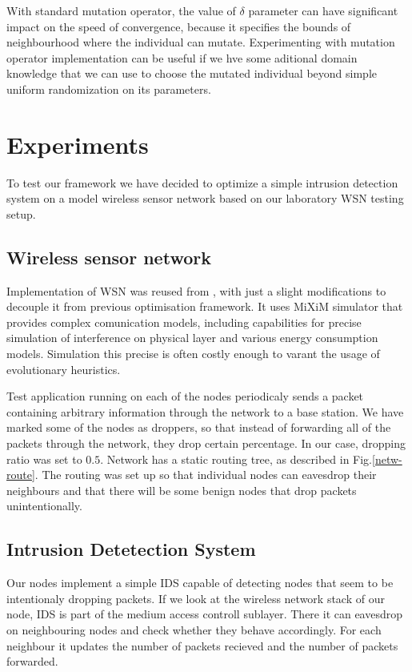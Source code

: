 \documentclass[12pt,oneside]{fithesis2}
\begin{document}
With standard mutation operator, the value of $\delta$ parameter can have significant impact on the speed of convergence, because it specifies the bounds of neighbourhood where the individual can mutate. Experimenting with mutation operator implementation can be useful if we hve some aditional domain knowledge that we can use to choose the mutated individual beyond simple uniform randomization on its parameters.


\chapter{Experiments}
\label{chap:exp}
To test our framework we have decided to optimize a simple intrusion detection system on a model wireless sensor network based on our laboratory WSN testing setup.

\section{Wireless sensor network}
Implementation of WSN was reused from \cite{stehl2013opt}, with just a slight modifications to decouple it from previous optimisation framework. It uses MiXiM simulator that provides complex comunication models, including capabilities for precise simulation of interference on physical layer and various energy consumption models. Simulation this precise is often costly enough to varant the usage of evolutionary heuristics.

Test application running on each of the nodes periodicaly sends a packet containing arbitrary information through the network to a base station. 
We have marked some of the nodes as droppers, so that instead of forwarding all of the packets through the network, they drop certain percentage. In our case, dropping ratio was set to $0.5$. Network has a static routing tree, as described in Fig.\ref{netw-route}. The routing was set up so that individual nodes can eavesdrop their neighbours and that there will be some benign nodes that drop packets unintentionally.

\section{Intrusion Detetection System}
Our nodes implement a simple IDS capable of detecting nodes that seem to be intentionaly dropping packets.
If we look at the wireless network stack of our node, IDS is part of the medium access controll sublayer.
There it can eavesdrop on neighbouring nodes and check whether they behave accordingly.
For each neighbour it updates the number of packets recieved and the number of packets forwarded.
\end{document}
